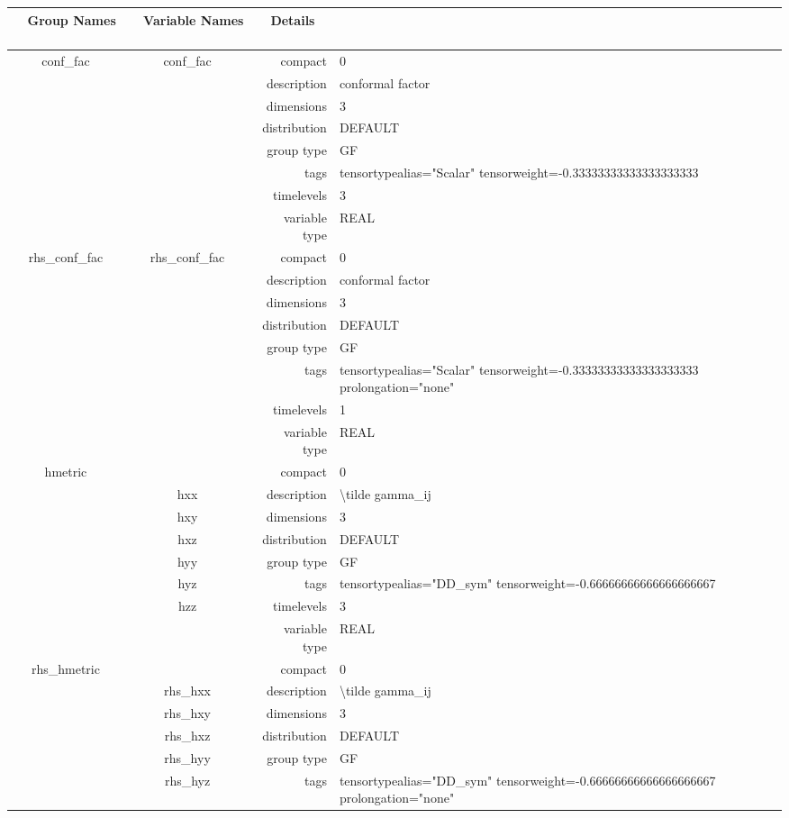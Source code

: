 \begin{tabular*}{150mm}{|c|c@{\extracolsep{\fill}}|rl|} \hline 
~ {\bf Group Names} ~ & ~ {\bf Variable Names} ~  &{\bf Details} ~ & ~\\ 
\hline 
conf\_fac & conf\_fac & compact & 0 \\ 
 &  & description & conformal factor \\ 
 &  & dimensions & 3 \\ 
 &  & distribution & DEFAULT \\ 
 &  & group type & GF \\ 
 &  & tags & tensortypealias="Scalar" tensorweight=-0.33333333333333333333 \\ 
 &  & timelevels & 3 \\ 
 &  & variable type & REAL \\ 
\hline 
rhs\_conf\_fac & rhs\_conf\_fac & compact & 0 \\ 
 &  & description & conformal factor \\ 
 &  & dimensions & 3 \\ 
 &  & distribution & DEFAULT \\ 
 &  & group type & GF \\ 
 &  & tags & tensortypealias="Scalar" tensorweight=-0.33333333333333333333 prolongation="none" \\ 
 &  & timelevels & 1 \\ 
 &  & variable type & REAL \\ 
\hline 
hmetric &  & compact & 0 \\ 
 & hxx & description & {\textbackslash}tilde gamma\_ij \\ 
 & hxy & dimensions & 3 \\ 
 & hxz & distribution & DEFAULT \\ 
 & hyy & group type & GF \\ 
 & hyz & tags & tensortypealias="DD\_sym" tensorweight=-0.66666666666666666667 \\ 
 & hzz & timelevels & 3 \\ 
 &  & variable type & REAL \\ 
\hline 
rhs\_hmetric &  & compact & 0 \\ 
 & rhs\_hxx & description & {\textbackslash}tilde gamma\_ij \\ 
 & rhs\_hxy & dimensions & 3 \\ 
 & rhs\_hxz & distribution & DEFAULT \\ 
 & rhs\_hyy & group type & GF \\ 
 & rhs\_hyz & tags & tensortypealias="DD\_sym" tensorweight=-0.66666666666666666667 prolongation="none" \\ 

\end{tabular*}
